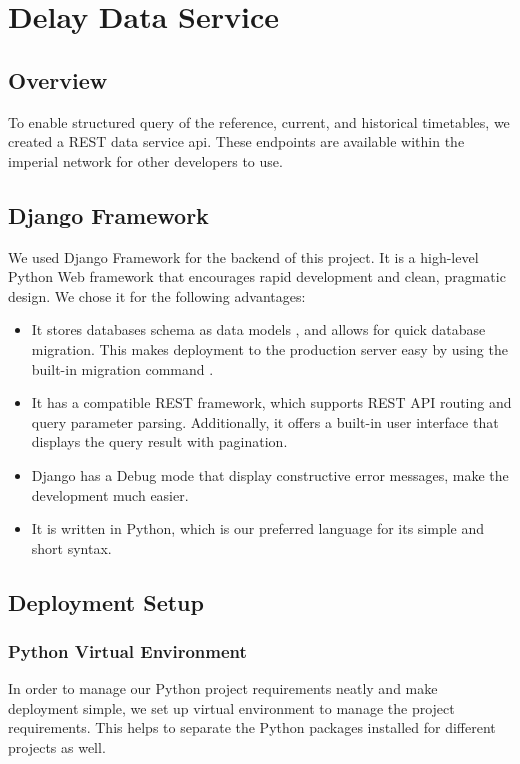 \chapter{Delay Data Service}
\label{ch:data_service}
\section{Overview}
\par To enable structured query of the reference, current, and historical timetables, we created a REST data service \acrshort{api}. These endpoints are available within the imperial network for other developers to use.

\section{Django Framework}
\par We used Django Framework \cite{django_framework} for the backend of this project. It is a high-level Python Web framework that encourages rapid development and clean, pragmatic design. We chose it for the following advantages:

\begin{itemize}
  \item It stores databases schema as data models \cite{django_model}, and allows for quick database migration. This makes deployment to the production server easy by using the built-in migration command \cite{django_migrations}.
  \item It has a compatible REST framework\cite{django_rest}, which supports REST API routing\cite{django_rest_routing} and query parameter parsing. Additionally, it offers a built-in user interface that displays the query result with pagination\cite{django_rest_pagination}.
  \item Django has a Debug mode that display constructive error messages, make the development much easier.
  \item It is written in Python, which is our preferred language for its simple and short syntax.
\end{itemize}

\section{Deployment Setup}
\subsection{Python Virtual Environment}
\par In order to manage our Python project requirements neatly and make deployment simple, we set up virtual environment\cite{virtualenv} \cite{virtualenvwrapper} to manage the project requirements. This helps to separate the Python packages installed for different projects as well.

